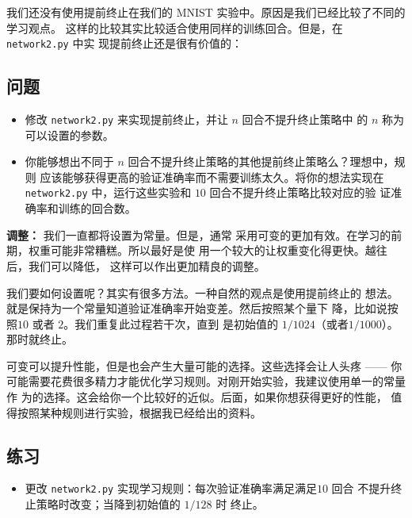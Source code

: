 我们还没有使用提前终止在我们的 MNIST 实验中。原因是我们已经比较了不同的学习观点。
这样的比较其实比较适合使用同样的训练回合。但是，在 \lstinline!network2.py! 中实
现提前终止还是很有价值的：

\subsection*{问题}

\begin{itemize}
\item 修改 \lstinline!network2.py! 来实现提前终止，并让 $n$ 回合不提升终止策略中
  的 $n$ 称为可以设置的参数。
\item 你能够想出不同于 $n$ 回合不提升终止策略的其他提前终止策略么？理想中，规则
  应该能够获得更高的验证准确率而不需要训练太久。将你的想法实现在
  \lstinline!network2.py! 中，运行这些实验和 $10$ 回合不提升终止策略比较对应的验
  证准确率和训练的回合数。
\end{itemize}

\textbf{\learningrate{}调整：} 我们一直都将\learningrate{}设置为常量。但是，通常
采用可变的\learningrate{}更加有效。在学习的前期，权重可能非常糟糕。所以最好是使
用一个较大的\learningrate{}让权重变化得更快。越往后，我们可以降低\learningrate{}，
这样可以作出更加精良的调整。

我们要如何设置\learningrate{}呢？其实有很多方法。一种自然的观点是使用提前终止的
想法。就是保持\learningrate{}为一个常量知道验证准确率开始变差。然后按照某个量下
降\learningrate{}，比如说按照$10$ 或者 $2$。我们重复此过程若干次，直到%
\learningrate{}是初始值的 $1/1024$（或者$1/1000$）。那时就终止。

可变\learningrate{}可以提升性能，但是也会产生大量可能的选择。这些选择会让人头疼
—— 你可能需要花费很多精力才能优化学习规则。对刚开始实验，我建议使用单一的常量作
为\learningrate{}的选择。这会给你一个比较好的近似。后面，如果你想获得更好的性能，
值得按照某种规则进行实验，根据我已经给出的资料。

\subsection*{练习}

\begin{itemize}
\item 更改 \lstinline!network2.py! 实现学习规则：每次验证准确率满足满足$10$ 回合
  不提升终止策略时改变\learningrate{}；当\learningrate{}降到初始值的 $1/128$ 时
  终止。
\end{itemize}

